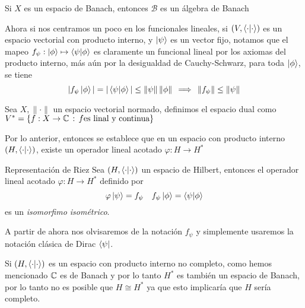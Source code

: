 \documentclass[main.tex]{subfiles}
\begin{document}
\eje Si \(X\) es un espacio de Banach, entonces \(\mathcal{B}\) es un álgebra de Banach

Ahora si  nos centramos un poco en los funcionales lineales, si \((V,\braket{\cdot|\cdot})\) es un espacio vectorial con producto interno, y \(\ket{\psi}\) es un vector fijo, notamos que el mapeo \(f_{\psi}:\ket{\phi}\mapsto\braket{\psi|\phi}\) es claramente un funcional lineal por los axiomas del producto interno, más aún por la desigualdad de Cauchy-Schwarz, para toda \(\ket{\phi}\), se tiene
\[
|f_{\psi}\ket{\phi}|=|\braket{\psi|\phi}|\leq\|\psi\|\,\|\phi\|\,\implies\,\|f_{\psi}\|\leq\|\psi\|
\]
\begin{def.}
Sea \(X,\|\cdot\|\) un espacio vectorial normado, definimos el espacio dual como \(V^*=\{f:X\rightarrow\mathbb C \,:\,f \text{es linal y continua}\}\)
\end{def.}

Por lo anterior, entonces se establece que en un espacio con producto interno \((H,\braket{\cdot|\cdot})\), existe un operador lineal acotado \(\varphi:H\rightarrow H^*\)

\begin{teorema}{Representación de Riez}
  Sea \((H,\braket{\cdot|\cdot})\) un espacio de Hilbert, entonces el operador lineal acotado \(\varphi:H\rightarrow H^*\) definido por
  \[
  \varphi\ket{\psi}=f_{\psi}\quad f_{\psi}\ket{\phi}=\braket{\psi|\phi}
  \]
  es un \emph{isomorfimo isométrico}.
  \end{teorema}
A partir de ahora nos olvisaremos de la notación \(f_{\psi}\) y simplemente usaremos la notación clásica de Dirac \(\bra{\psi}\).

\obs Si \((H,\braket{\cdot|\cdot})\) es un espacio con producto interno no completo, como hemos mencionado \(\mathbb C \) es de Banach y por lo tanto \(H^{*}\) es también un espacio de Banach, por lo tanto no es posible que \(H\cong H^{*}\) ya que esto implicaría que \(H\) sería completo.
\end{document}
